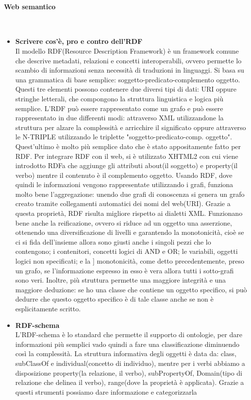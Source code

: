 \documentclass[10pt,                    %
               a4paper,                 %
               twoside,                 %
               openright,               %
               english,                 
               italian,                 
]{article}
\begin{document}
\paragraph{Web semantico} \mbox{}\\
\begin{itemize}
\item \textbf{Scrivere cos'è, pro e contro dell'RDF} \\
Il modello RDF(Resource Description Framework) è un framework comune che 
descrive metadati, relazioni e concetti interoperabili, ovvero permette lo
scambio di informazioni senza necessità di traduzioni in linguaggi. Si basa 
su una grammatica di base semplice: soggetto-predicato-complemento oggetto.
Questi tre elementi possono contenere due diversi tipi di dati: URI oppure 
stringhe letterali, che compongono la struttura linguistica e logica più 
semplice. L'RDF può essere rappresentato come un grafo e può essere 
rappresentato in due differenti modi: attraverso XML utilizzandone la 
struttura per alzare la complessità e arricchire il significato oppure 
attraverso le N-TRIPLE utilizzando le triplette "soggetto-predicato-comp. 
oggetto". Quest'ultimo è molto più semplice dato che è stato appositamente
fatto per RDF. Per integrare RDF con il web, si è utilizzato XHTML2 con cui 
viene introdotto RDFa che aggiunge gli attributi about(il soggetto) e 
property(il verbo) mentre il contenuto è il complemento oggetto.
Usando RDF, dove quindi le informazioni vengono rappresentate utilizzando 
i grafi, funziona molto bene l'aggregazione: unendo due grafi di conoscenza 
si genera un grafo creato tramite collegamenti automatici dei nomi del 
web(URI). Grazie a questa proprietà, RDF risulta migliore rispetto ai 
dialetti XML. Funzionano bene anche la reificazione, ovvero si riduce ad un
oggetto una asserzione, ottenendo una diversificazione di livelli e 
garantendo la monotonicità, cioè se ci si fida dell'insieme allora sono 
giusti anche i singoli pezzi che lo contengono; i contenitori, concetti 
logici di AND e OR; le variabili, oggetti logici non specificati; e la ]
monotonicità, come detto precedentemente, preso un grafo, se l'informazione
espresso in esso è vera allora tutti i sotto-grafi sono veri.
Inoltre, più struttura permette una maggiore integrità e una maggiore 
deduzione: se ho una classe che contiene un oggetto specifico, si può dedurre
che questo oggetto specifico è di tale classe anche se non è esplicitamente 
scritto.

\item \textbf{RDF-schema} \\
L'RDF-schema è lo standard che permette il supporto di ontologie, per dare 
informazioni più semplici vado quindi a fare una classificazione diminuendo 
così la complessità. La struttura informativa degli oggetti è data da: class, 
subClassOf e individual(concetto di individuo), mentre per i verbi abbiamo a 
disposizione property(la relazione, il verbo), subPropertyOf, Domain(tipo di 
relazione che delinea il verbo), range(dove la proprietà è applicata).
Grazie a questi strumenti possiamo dare informazione e categorizzarla 


\end{itemize}
\end{document}
